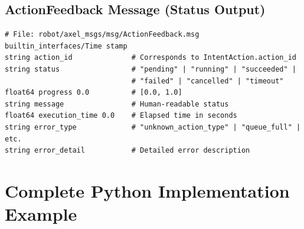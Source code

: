 \documentclass{article}
\begin{document}
\subsection{ActionFeedback Message (Status Output)}

\begin{lstlisting}
# File: robot/axel_msgs/msg/ActionFeedback.msg
builtin_interfaces/Time stamp
string action_id              # Corresponds to IntentAction.action_id
string status                 # "pending" | "running" | "succeeded" | 
                              # "failed" | "cancelled" | "timeout"
float64 progress 0.0          # [0.0, 1.0]
string message                # Human-readable status
float64 execution_time 0.0    # Elapsed time in seconds
string error_type             # "unknown_action_type" | "queue_full" | etc.
string error_detail           # Detailed error description
\end{lstlisting}

\section{Complete Python Implementation Example}
\end{document}
